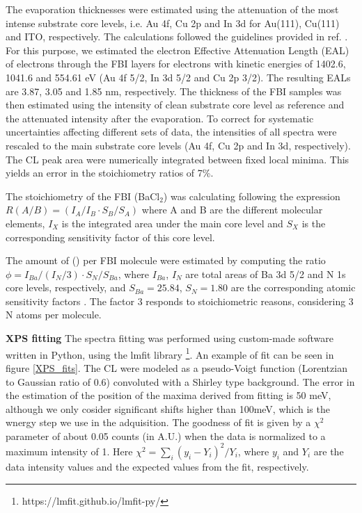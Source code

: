 \documentclass[aps,prl,reprint,longbibliography,superscriptaddress, english]{revtex4-1}
\def\BappCl{BaCl$_2$}
\begin{document}
The evaporation thicknesses were estimated using the attenuation of the most intense substrate core levels, i.e. Au 4f, Cu 2p and In 3d for Au(111), Cu(111) and ITO, respectively. The calculations followed the guidelines provided in ref. \cite{powell_practical_2020}. For this purpose, we estimated the electron Effective Attenuation Length (EAL) of electrons through the FBI layers for electrons with kinetic energies of 1402.6, 1041.6 and 554.61 eV (Au 4f 5/2, In 3d 5/2 and Cu 2p 3/2). The resulting EALs are 3.87, 3.05 and 1.85 nm, respectively. The thickness of the FBI samples was then estimated using the intensity of clean substrate core level as reference and the attenuated intensity after the evaporation. To correct for systematic uncertainties affecting different sets of data, the intensities of all spectra were rescaled to the main substrate core levels (Au 4f, Cu 2p and In 3d, respectively). The CL peak area were numerically integrated between fixed local minima. This yields an error in the stoichiometry ratios of 7\%. 

The stoichiometry of the FBI (\BappCl) was calculating following the expression $ R(A/B)=(I_{A}/I_{B} \cdot S_B/S_{A})$ where A and B are the different molecular elements, $I_{X}$ is the integrated area under the main core level and $S_{X}$ is the corresponding sensitivity factor of this core level.

The amount of \Bapp (\Nap) per FBI molecule were estimated by computing  the ratio $\phi=I_{Ba}/(I_N/3) \cdot S_N/S_{Ba} $, where $I_{Ba}$, $I_N$ are total areas  of Ba 3d 5/2 and  N 1s core  levels, respectively, and $S_{Ba} = 25.84$, $S_N = 1.80$ are the corresponding atomic sensitivity factors \cite{scofield_hartree-slater_1976}. The factor 3 responds to stoichiometric reasons, considering 3 N atoms per molecule.

\textbf{XPS fitting}
The spectra fitting was performed using custom-made software written in Python, using the lmfit library \footnote{https://lmfit.github.io/lmfit-py/}. An example of fit can be seen in figure \ref{XPS_fits}. The CL were modeled as a pseudo-Voigt function (Lorentzian to Gaussian ratio of 0.6) convoluted with a Shirley type background. The error in the estimation of the position of the maxima derived from fitting is 50 meV, although we only cosider significant shifts higher than 100meV, which is the wnergy step we use in the adquisition. The goodness of fit is given by a $\chi^2$ parameter of about 0.05 counts (in A.U.) when the data is normalized to a maximum intensity of 1. Here $\chi^2 = \sum_i (y_i- Y_i)^2/Y_i$, where $y_i$ and $Y_i$ are the data intensity values and the expected values from the fit, respectively.
\end{document}
